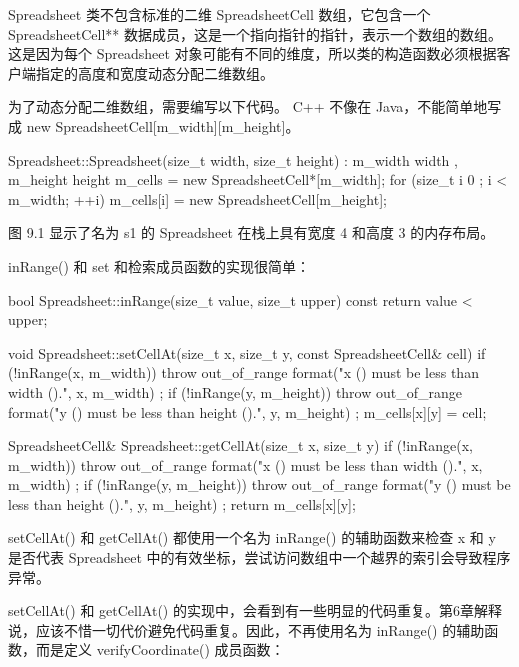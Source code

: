 Spreadsheet 类不包含标准的二维 SpreadsheetCell 数组，它包含一个 SpreadsheetCell** 数据成员，这是一个指向指针的指针，表示一个数组的数组。这是因为每个 Spreadsheet 对象可能有不同的维度，所以类的构造函数必须根据客户端指定的高度和宽度动态分配二维数组。

为了动态分配二维数组，需要编写以下代码。 C++ 不像在 Java，不能简单地写成 new SpreadsheetCell[m\_width][m\_height]。

\begin{cpp}
Spreadsheet::Spreadsheet(size_t width, size_t height)
: m_width { width }, m_height { height }
{
    m_cells = new SpreadsheetCell*[m_width];
    for (size_t i { 0 }; i < m_width; ++i) {
        m_cells[i] = new SpreadsheetCell[m_height];
    }
}
\end{cpp}

图 9.1 显示了名为 s1 的 Spreadsheet 在栈上具有宽度 4 和高度 3 的内存布局。


inRange() 和 set 和检索成员函数的实现很简单：

\begin{cpp}
bool Spreadsheet::inRange(size_t value, size_t upper) const
{
    return value < upper;
}

void Spreadsheet::setCellAt(size_t x, size_t y, const SpreadsheetCell& cell)
{
    if (!inRange(x, m_width)) {
        throw out_of_range {
            format("x ({}) must be less than width ({}).", x, m_width) };
    }
    if (!inRange(y, m_height)) {
        throw out_of_range {
            format("y ({}) must be less than height ({}).", y, m_height) };
    }
    m_cells[x][y] = cell;
}

SpreadsheetCell& Spreadsheet::getCellAt(size_t x, size_t y)
{
    if (!inRange(x, m_width)) {
        throw out_of_range {
            format("x ({}) must be less than width ({}).", x, m_width) };
    }
    if (!inRange(y, m_height)) {
        throw out_of_range {
            format("y ({}) must be less than height ({}).", y, m_height) };
    }
    return m_cells[x][y];
}
\end{cpp}

setCellAt() 和 getCellAt() 都使用一个名为 inRange() 的辅助函数来检查 x 和 y 是否代表 Spreadsheet 中的有效坐标，尝试访问数组中一个越界的索引会导致程序异常。

setCellAt() 和 getCellAt() 的实现中，会看到有一些明显的代码重复。第6章解释说，应该不惜一切代价避免代码重复。因此，不再使用名为 inRange() 的辅助函数，而是定义 verifyCoordinate() 成员函数：

